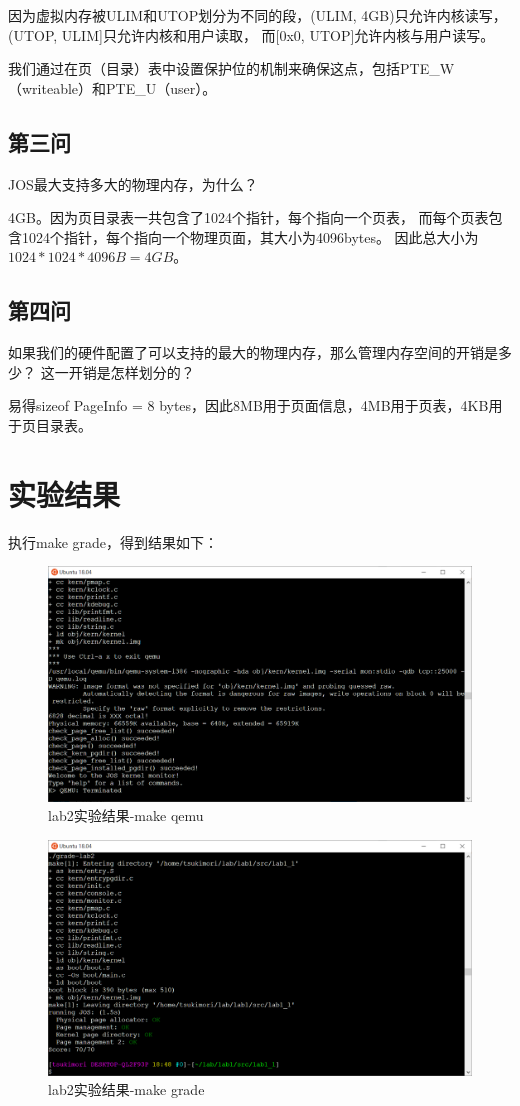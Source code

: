 \documentclass[12pt,a4paper,UTF8]{article}
\begin{document}
    因为虚拟内存被ULIM和UTOP划分为不同的段，(ULIM, 4GB)只允许内核读写，(UTOP, ULIM]只允许内核和用户读取，
    而[0x0, UTOP]允许内核与用户读写。

    我们通过在页（目录）表中设置保护位的机制来确保这点，包括PTE\_W（writeable）和PTE\_U（user）。

    \subsection{第三问}
    JOS最大支持多大的物理内存，为什么？

    4GB。因为页目录表一共包含了1024个指针，每个指向一个页表，
    而每个页表包含1024个指针，每个指向一个物理页面，其大小为4096bytes。
    因此总大小为$1024*1024*4096B=4GB$。
    
    \subsection{第四问}
    如果我们的硬件配置了可以支持的最大的物理内存，那么管理内存空间的开销是多少？
    这一开销是怎样划分的？

    易得sizeof PageInfo = 8 bytes，因此8MB用于页面信息，4MB用于页表，4KB用于页目录表。

\section{实验结果}

    执行make grade，得到结果如下：
    \begin{figure}[H]
        \centering
        \includegraphics[width = .85\linewidth]{img/2.png}
        \caption{lab2实验结果-make qemu}
        \label{fig::figure2}
    \end{figure}

    \begin{figure}[H]
        \centering
        \includegraphics[width = .85\linewidth]{img/3.png}
        \caption{lab2实验结果-make grade}
        \label{fig::figure3}
    \end{figure}
\end{document}

